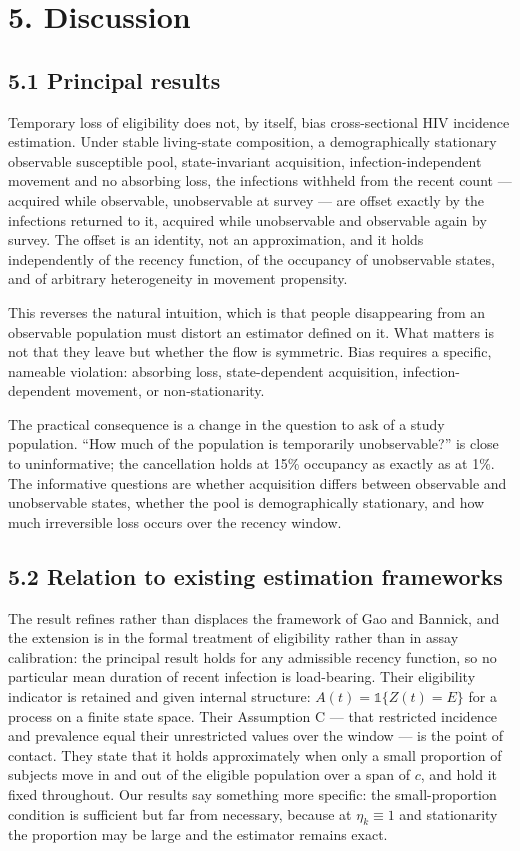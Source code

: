 \section{5. Discussion}

\subsection{5.1 Principal results}

Temporary loss of eligibility does not, by itself, bias cross-sectional HIV incidence estimation. Under stable living-state composition, a demographically stationary observable susceptible pool, state-invariant acquisition, infection-independent movement and no absorbing loss, the infections withheld from the recent count --- acquired while observable, unobservable at survey --- are offset exactly by the infections returned to it, acquired while unobservable and observable again by survey. The offset is an identity, not an approximation, and it holds independently of the recency function, of the occupancy of unobservable states, and of arbitrary heterogeneity in movement propensity.

This reverses the natural intuition, which is that people disappearing from an observable population must distort an estimator defined on it. What matters is not that they leave but whether the flow is symmetric. Bias requires a specific, nameable violation: absorbing loss, state-dependent acquisition, infection-dependent movement, or non-stationarity.

The practical consequence is a change in the question to ask of a study population. ``How much of the population is temporarily unobservable?'' is close to uninformative; the cancellation holds at 15\% occupancy as exactly as at 1\%. The informative questions are whether acquisition differs between observable and unobservable states, whether the pool is demographically stationary, and how much irreversible loss occurs over the recency window.

\subsection{5.2 Relation to existing estimation frameworks}

The result refines rather than displaces the framework of Gao and Bannick, and the extension is in the formal treatment of eligibility rather than in assay calibration: the principal result holds for any admissible recency function, so no particular mean duration of recent infection is load-bearing. Their eligibility indicator is retained and given internal structure: \(A(t)=\mathbb{1}\{Z(t)=E\}\) for a process on a finite state space. Their Assumption C --- that restricted incidence and prevalence equal their unrestricted values over the window --- is the point of contact. They state that it holds approximately when only a small proportion of subjects move in and out of the eligible population over a span of \(c\), and hold it fixed throughout. Our results say something more specific: the small-proportion condition is sufficient but far from necessary, because at \(\eta_k\equiv1\) and stationarity the proportion may be large and the estimator remains exact.

